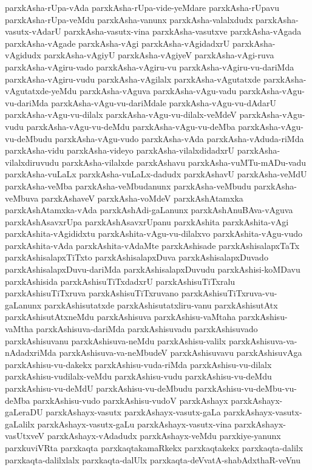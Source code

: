 {parxkAsha-rUpa-vAda
parxkAsha-rUpa-vide-yeMdare
parxkAsha-rUpavu
parxkAsha-rUpa-veMdu
parxkAsha-vanunx
parxkAsha-valalxdudx
parxkAsha-vasutx-vAdarU
parxkAsha-vasutx-vina
parxkAsha-vasutxve
parxkAsha-vAgada
parxkAsha-vAgade
parxkAsha-vAgi
parxkAsha-vAgidadxrU
parxkAsha-vAgidudx
parxkAsha-vAgiyU
parxkAsha-vAgiyeV
parxkAsha-vAgi-ruva
parxkAsha-vAgiru-vado
parxkAsha-vAgiru-vu
parxkAsha-vAgiru-vu-dariMda
parxkAsha-vAgiru-vudu
parxkAsha-vAgilalx
parxkAsha-vAgutatxde
parxkAsha-vAgutatxde-yeMdu
parxkAsha-vAguva
parxkAsha-vAgu-vadu
parxkAsha-vAgu-vu-dariMda
parxkAsha-vAgu-vu-dariMdale
parxkAsha-vAgu-vu-dAdarU
parxkAsha-vAgu-vu-dilalx
parxkAsha-vAgu-vu-dilalx-veMdeV
parxkAsha-vAgu-vudu
parxkAsha-vAgu-vu-deMdu
parxkAsha-vAgu-vu-deMba
parxkAsha-vAgu-vu-deMbudu
parxkAsha-vAgu-vudo
parxkAsha-vAda
parxkAsha-vAduda-riMda
parxkAsha-vidu
parxkAsha-videyo
parxkAsha-vilalxdidadxrU
parxkAsha-vilalxdiruvudu
parxkAsha-vilalxde
parxkAshavu
parxkAsha-vuMTu-mADu-vadu
parxkAsha-vuLaLx
parxkAsha-vuLaLx-dadudx
parxkAshavU
parxkAsha-veMdU
parxkAsha-veMba
parxkAsha-veMbudanunx
parxkAsha-veMbudu
parxkAsha-veMbuva
parxkAshaveV
parxkAsha-voMdeV
parxkAshAtamxka
parxkAshAtamxka-vAda
parxkAshAdi-gaLanunx
parxkAshAnuBAva-vAguva
parxkAshAsavxrUpa
parxkAshAsavxrUpanu
parxkAshita
parxkAshita-vAgi
parxkAshita-vAgididxtu
parxkAshita-vAgu-vu-dilalxvo
parxkAshita-vAgu-vudo
parxkAshita-vAda
parxkAshita-vAdaMte
parxkAshisade
parxkAshisalapxTaTx
parxkAshisalapxTiTxto
parxkAshisalapxDuva
parxkAshisalapxDuvado
parxkAshisalapxDuvu-dariMda
parxkAshisalapxDuvudu
parxkAshisi-koMDavu
parxkAshisida
parxkAshisuTiTxdadxrU
parxkAshisuTiTxralu
parxkAshisuTiTxruva
parxkAshisuTiTxruvano
parxkAshisuTiTxruva-vu-gaLanunx
parxkAshisutatxde
parxkAshisutatxliru-vanu
parxkAshisutAtx
parxkAshisutAtxneMdu
parxkAshisuva
parxkAshisu-vaMtaha
parxkAshisu-vaMtha
parxkAshisuva-dariMda
parxkAshisuvadu
parxkAshisuvado
parxkAshisuvanu
parxkAshisuva-neMdu
parxkAshisu-valilx
parxkAshisuva-va-nAdadxriMda
parxkAshisuva-va-neMbudeV
parxkAshisuvavu
parxkAshisuvAga
parxkAshisu-vu-dakekx
parxkAshisu-vuda-riMda
parxkAshisu-vu-dilalx
parxkAshisu-vudilalx-veMdu
parxkAshisu-vudu
parxkAshisu-vu-deMdu
parxkAshisu-vu-deMdU
parxkAshisu-vu-deMbudu
parxkAshisu-vu-deMbu-vu-deMba
parxkAshisu-vudo
parxkAshisu-vudoV
parxkAshayx
parxkAshayx-gaLeraDU
parxkAshayx-vasutx
parxkAshayx-vasutx-gaLa
parxkAshayx-vasutx-gaLalilx
parxkAshayx-vasutx-gaLu
parxkAshayx-vasutx-vina
parxkAshayx-vasUtxveV
parxkAshayx-vAdadudx
parxkAshayx-veMdu
parxkiye-yanunx
parxkuviVRta
parxkaqta
parxkaqtakamaRkekx
parxkaqtakekx
parxkaqta-dalilx
parxkaqta-dalilxlalx
parxkaqta-dalUlx
parxkaqta-deVvatA-shabAdxthaR-veVnu
}
